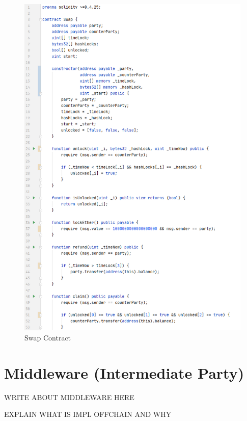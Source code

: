\begin{figure}[h]
	\includegraphics[width=0.7\paperwidth]{swap_contract}
	\caption{Swap Contract}
	\label{fig:swap_contract}
\end{figure}
\clearpage

\section{Middleware (Intermediate Party)}
\label{sec:chapter04:middleware}
WRITE ABOUT MIDDLEWARE HERE

EXPLAIN WHAT IS IMPL OFFCHAIN AND WHY

